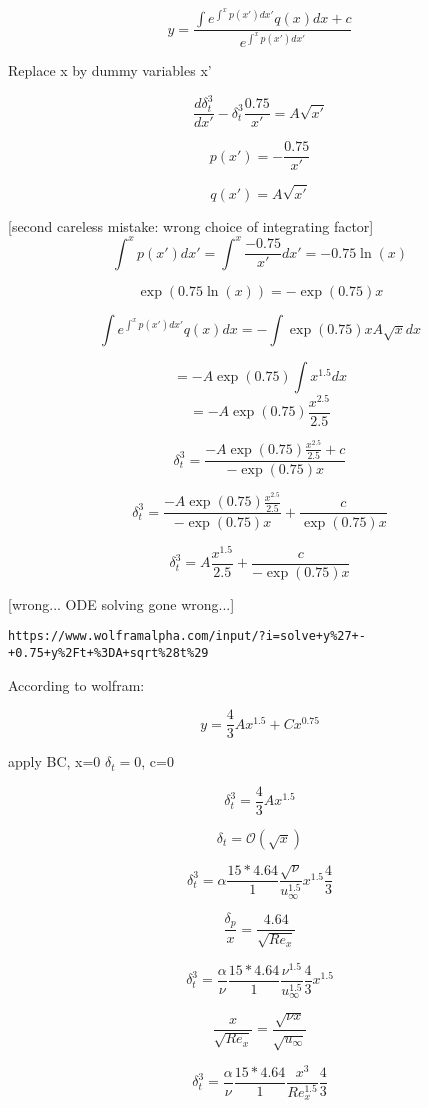 \documentclass[11pt]{article}
\begin{document}
$$y = \frac{\int e^{\int^x p(x') dx'} q(x) dx + c }{e^{\int^x p(x') dx'}}$$

Replace x by dummy variables x'

$$  \frac{d \delta_t^3}{dx'} - \delta_t^3  \frac{0.75}{x'}  =  A \sqrt{x'} $$ 

$$p(x') = -\frac{0.75}{x'}$$

$$q(x') = A \sqrt{x'}$$

[second careless mistake: wrong choice of integrating factor]
$$ \int^x p(x') dx' = \int^x \frac{-0.75}{x'} dx' = -0.75 \ln (x)  $$ 


$$\exp (0.75 \ln (x)) = -\exp(0.75) x$$


$$\int e^{\int^x p(x') dx'} q(x) dx  = -\int \exp(0.75) x  A \sqrt{x} dx  $$

$$=-A \exp (0.75) \int x^{1.5} dx $$
$$=-A \exp (0.75) \frac{x^{2.5}}{2.5}$$

$$\delta_t^3 = \frac{-A \exp (0.75) \frac{x^{2.5}}{2.5} + c }{-\exp(0.75) x}$$

$$\delta_t^3 = \frac{-A \exp (0.75) \frac{x^{2.5}}{2.5} }{-\exp(0.75) x}+\frac{c }{\exp(0.75) x}$$

$$\delta_t^3 = A  \frac{x^{1.5}}{2.5}  +\frac{c }{-\exp(0.75) x}$$

[wrong... ODE solving gone wrong...]

\begin{verbatim}
https://www.wolframalpha.com/input/?i=solve+y%27+-+0.75+y%2Ft+%3DA+sqrt%28t%29
\end{verbatim}

According to wolfram:

$$y = \frac{4}{3} A x^{1.5} + C x^{0.75}$$

apply BC, x=0 $\delta_t= 0$, c=0

$$\delta_t^3 = \frac{4}{3} A  x^{1.5}  $$

$$\delta_t = \mathcal{O}( \sqrt{x})$$

$$\delta_t^3 =  \alpha \frac{15*4.64}{1} \frac{\sqrt{\nu}}{u_\infty^{1.5}}  x^{1.5} \frac{4}{3}  $$

$$\frac{\delta_p}{x} = \frac{4.64}{\sqrt{Re_x}}$$

$$\delta_t^3 =  \frac{\alpha}{\nu} \frac{15*4.64}{1} \frac{\nu^{1.5}}{u_\infty^{1.5}}   \frac{4}{3} x^{1.5} $$


$$\frac{x}{\sqrt{Re_x}} = \frac{\sqrt{\nu x}}{\sqrt{u_\infty}}$$

$$\delta_t^3 =  \frac{\alpha}{\nu} \frac{15*4.64}{1} \frac{x^3}{Re_x^{1.5}}   \frac{4}{3}   $$
\end{document}
